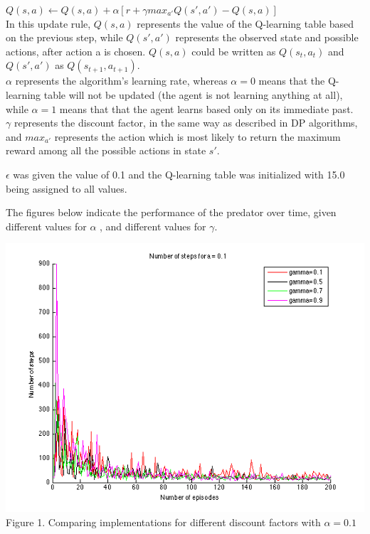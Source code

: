 \documentclass[a4paper,11pt]{article}
\begin{document}
$Q(s,a) \leftarrow  Q(s,a) + \alpha \left[ r + \gamma  max_{a'} Q(s',a') - Q(s,a)\right]$ \\

In this update rule, $Q(s,a)$ represents the value of the Q-learning table based on the previous step, while $Q(s',a')$ represents the observed state and possible actions, after action a is chosen. $Q(s,a)$ could be written as $Q(s_t,a_t)$ and $Q(s',a')$ as $Q(s_{t+1}, a_{t+1})$.\\
$\alpha$ represents the algorithm's learning rate, whereas $\alpha =0$ means that the Q-learning table will not be updated (the agent is not learning anything at all), while $\alpha =1$ means that that the agent learns based only on its immediate past.\\
$\gamma$ represents the discount factor, in the same way as described in DP algorithms, and $max_{a'}$ represents the action which is most likely to return the maximum reward among all the possible actions in state $s'$.

$\epsilon$ was given the value of 0.1 and the Q-learning table was initialized with 15.0 being assigned to all values. 


The figures below indicate the performance of the predator over time, given different values for $\alpha$ , and different values for $\gamma$.




\begin{center}
\includegraphics[width=1.0\textwidth,height=0.4\textheight]{a1.png}
\label{Figure 1}
Figure 1. 	Comparing implementations for different discount factors with $\alpha = 0.1$\vspace{1cm}
\end{center}
\end{document}
